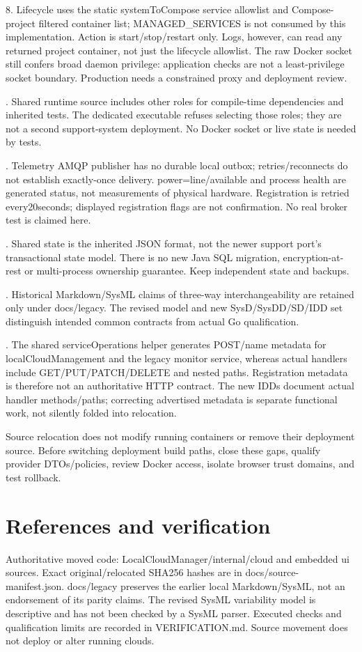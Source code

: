 \documentclass[a4paper]{arrowhead}
\begin{document}
8. Lifecycle uses the static systemToCompose service allowlist and Compose-project filtered container list; MANAGED\_SERVICES is not consumed by this implementation. Action is start/stop/restart only. Logs, however, can read any returned project container, not just the lifecycle allowlist. The raw Docker socket still confers broad daemon privilege: application checks are not a least-privilege socket boundary. Production needs a constrained proxy and deployment review.\par{}. Shared runtime source includes other roles for compile-time dependencies and inherited tests. The dedicated executable refuses selecting those roles; they are not a second support-system deployment. No Docker socket or live state is needed by tests.\par{}. Telemetry AMQP publisher has no durable local outbox; retries/reconnects do not establish exactly-once delivery. power=line/available and process health are generated status, not measurements of physical hardware. Registration is retried every20seconds; displayed registration flags are not confirmation. No real broker test is claimed here.\par{}. Shared state is the inherited JSON format, not the newer support port's transactional state model. There is no new Java SQL migration, encryption-at-rest or multi-process ownership guarantee. Keep independent state and backups.\par{}. Historical Markdown/SysML claims of three-way interchangeability are retained only under docs/legacy. The revised model and new SysD/SysDD/SD/IDD set distinguish intended common contracts from actual Go qualification.\par{}. The shared serviceOperations helper generates POST/name metadata for localCloudManagement and the legacy monitor service, whereas actual handlers include GET/PUT/PATCH/DELETE and nested paths. Registration metadata is therefore not an authoritative HTTP contract. The new IDDs document actual handler methods/paths; correcting advertised metadata is separate functional work, not silently folded into relocation.\par\medskip
Source relocation does not modify running containers or remove their deployment source. Before switching deployment build paths, close these gaps, qualify provider DTOs/policies, review Docker access, isolate browser trust domains, and test rollback.\par\medskip
\section{References and verification}
Authoritative moved code: LocalCloudManager/internal/cloud and embedded ui sources. Exact original/relocated SHA256 hashes are in docs/source-manifest.json. docs/legacy preserves the earlier local Markdown/SysML, not an endorsement of its parity claims. The revised SysML variability model is descriptive and has not been checked by a SysML parser. Executed checks and qualification limits are recorded in VERIFICATION.md. Source movement does not deploy or alter running clouds.
\end{document}
